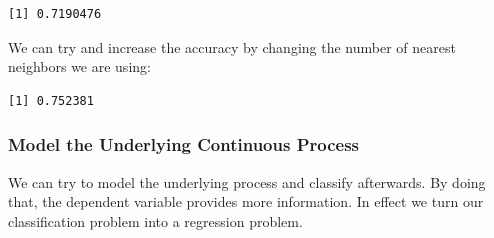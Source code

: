 \documentclass[]{article}
\newenvironment{Shaded}{\begin{snugshade}}{\end{snugshade}}
\newcommand{\CommentTok}[1]{\textcolor[rgb]{0.56,0.35,0.01}{\textit{#1}}}
\newcommand{\DataTypeTok}[1]{\textcolor[rgb]{0.13,0.29,0.53}{#1}}
\newcommand{\DecValTok}[1]{\textcolor[rgb]{0.00,0.00,0.81}{#1}}
\newcommand{\KeywordTok}[1]{\textcolor[rgb]{0.13,0.29,0.53}{\textbf{#1}}}
\newcommand{\NormalTok}[1]{#1}
\newcommand{\OperatorTok}[1]{\textcolor[rgb]{0.81,0.36,0.00}{\textbf{#1}}}
\newcommand{\StringTok}[1]{\textcolor[rgb]{0.31,0.60,0.02}{#1}}
\begin{document}
\begin{Shaded}
\end{Shaded}

\begin{verbatim}
[1] 0.7190476
\end{verbatim}

We can try and increase the accuracy by changing the number of nearest neighbors we are using:

\begin{Shaded}
\end{Shaded}

\begin{verbatim}
[1] 0.752381
\end{verbatim}

\hypertarget{model-the-underlying-continuous-process}{%
\subsubsection{Model the Underlying Continuous Process}\label{model-the-underlying-continuous-process}}

We can try to model the underlying process and classify afterwards. By doing that, the dependent variable provides more information. In effect we turn our classification problem into a regression problem.
\end{document}
